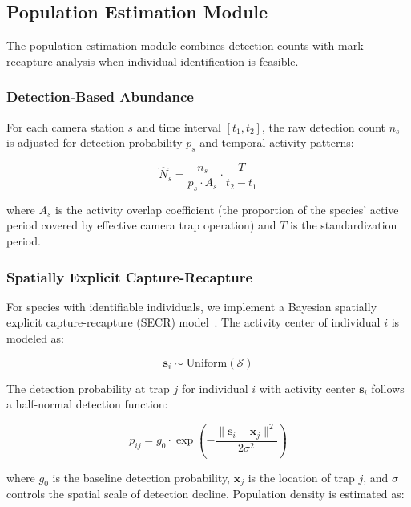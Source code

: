 \subsection{Population Estimation Module}

The population estimation module combines detection counts with mark-recapture analysis when individual identification is feasible.

\subsubsection{Detection-Based Abundance}

For each camera station $s$ and time interval $[t_1, t_2]$, the raw detection count $n_s$ is adjusted for detection probability $p_s$ and temporal activity patterns:

\begin{equation}
\hat{N}_s = \frac{n_s}{p_s \cdot A_s} \cdot \frac{T}{t_2 - t_1}
\end{equation}

where $A_s$ is the activity overlap coefficient (the proportion of the species' active period covered by effective camera trap operation) and $T$ is the standardization period.

\subsubsection{Spatially Explicit Capture-Recapture}

For species with identifiable individuals, we implement a Bayesian spatially explicit capture-recapture (SECR) model~\cite{efford2004}. The activity center of individual $i$ is modeled as:

\begin{equation}
\mathbf{s}_i \sim \text{Uniform}(\mathcal{S})
\end{equation}

The detection probability at trap $j$ for individual $i$ with activity center $\mathbf{s}_i$ follows a half-normal detection function:

\begin{equation}
p_{ij} = g_0 \cdot \exp\left(-\frac{\|\mathbf{s}_i - \mathbf{x}_j\|^2}{2\sigma^2}\right)
\end{equation}

where $g_0$ is the baseline detection probability, $\mathbf{x}_j$ is the location of trap $j$, and $\sigma$ controls the spatial scale of detection decline. Population density is estimated as:

